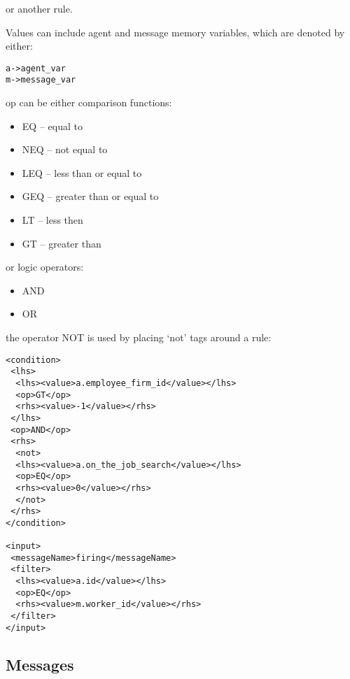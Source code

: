 or another rule.

Values can include agent and message memory variables, which are denoted by either:

\begin{mylisting}
\begin{verbatim}
a->agent_var
m->message_var
\end{verbatim}
\end{mylisting}

op can be either comparison functions:

\begin{itemize}
\item EQ -- equal to
\item NEQ -- not equal to
\item LEQ -- less than or equal to
\item GEQ -- greater than or equal to
\item LT -- less then
\item GT -- greater than
\end{itemize}
or logic operators:
\begin{itemize}
\item AND
\item OR
\end{itemize}
the operator NOT is used by placing `not' tags around a rule:
\begin{mylisting}
\begin{verbatim}
<condition>
 <lhs>
  <lhs><value>a.employee_firm_id</value></lhs>
  <op>GT</op>
  <rhs><value>-1</value></rhs>
 </lhs>
 <op>AND</op>
 <rhs>
  <not>
  <lhs><value>a.on_the_job_search</value></lhs>
  <op>EQ</op>
  <rhs><value>0</value></rhs>
  </not>
 </rhs>
</condition>

<input>
 <messageName>firing</messageName>
 <filter>
  <lhs><value>a.id</value></lhs>
  <op>EQ</op>
  <rhs><value>m.worker_id</value></rhs>
 </filter>
</input>
\end{verbatim}
\end{mylisting}

\subsection{Messages}

